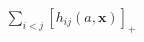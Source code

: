 \documentclass[preview]{standalone}
\begin{document}
\begin{align*}
\sum_{i<j}[h_{ij}(a,\mathbf{x})]_+
\end{align*}
\end{document}
